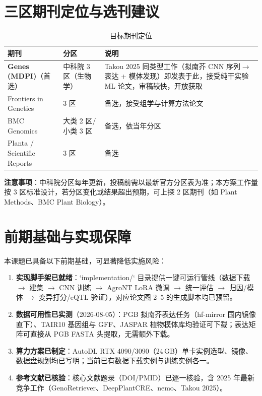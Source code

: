 \documentclass[UTF8,11pt,a4paper]{ctexart}
\begin{document}
\section{三区期刊定位与选刊建议}
\label{sec:journal}

\begin{table}[htbp]
\centering
\caption{目标期刊定位}
\label{tab:journal}
\small
\begin{tabular}{@{}p{4.4cm}p{3.0cm}p{6.8cm}@{}}
\toprule
\textbf{期刊} & \textbf{分区} & \textbf{说明} \\
\midrule
\textbf{Genes (MDPI)}（首选） & 中科院 3 区（生物学） & Takou 2025 同类型工作（拟南芥 CNN 序列$\rightarrow$表达 + 模体发现）即发表于此\cite{takou2025}，接受纯干实验 ML 论文，审稿较快，开放获取 \\
Frontiers in Genetics & 3 区 & 备选，接受组学与计算方法论文 \\
BMC Genomics & 大类 2 区/小类 3 区 & 备选，依当年分区 \\
Planta / Scientific Reports & 3 区 & 备选 \\
\bottomrule
\end{tabular}
\end{table}

\noindent\textbf{注意事项}：中科院分区每年更新，投稿前需以最新官方分区表为准；本方案工作量按 3 区标准设计，若分区变化或结果超出预期，可上探 2 区期刊（如 Plant Methods、BMC Plant Biology）。

\section{前期基础与实现保障}
\label{sec:prelim}

本课题已具备以下前期基础，可显著降低实施风险：

\begin{enumerate}
\item \textbf{实现脚手架已就绪}：`implementation/` 目录提供一键可运行管线（数据下载 $\rightarrow$ 建集 $\rightarrow$ CNN 训练 $\rightarrow$ AgroNT LoRA 微调 $\rightarrow$ 统一评估 $\rightarrow$ 归因/模体 $\rightarrow$ 变异打分/eQTL 验证），对应论文图 2--5 的生成脚本均已预留。
\item \textbf{数据可用性已实测}（2026-08-05）：PGB 拟南芥表达任务（hf-mirror 国内镜像直下）、TAIR10 基因组与 GFF、JASPAR 植物模体库均验证可下载；表达矩阵可直接从 PGB FASTA 头提取，无需额外下载。
\item \textbf{算力方案已制定}：AutoDL RTX 4090/3090（24\,GB）单卡实例选型、镜像、数据盘规划均已写明；当前已有数据下载实例与训练实例各一。
\item \textbf{参考文献已核验}：核心文献题录（DOI/PMID）已逐一核验，含 2025 年最新竞争工作（GenoRetriever、DeepPlantCRE、nemo、Takou 2025）。
\end{enumerate}
\end{document}
